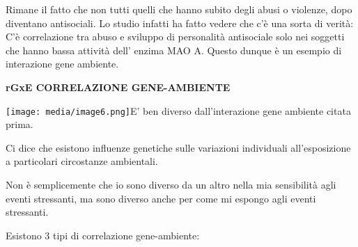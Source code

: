 \documentclass[]{article}
\begin{document}
Rimane il fatto che non tutti quelli che hanno subito degli abusi o
violenze, dopo diventano antisociali. Lo studio infatti ha fatto vedere
che c'è una sorta di verità: C'è correlazione tra abuso e sviluppo di
personalità antisociale solo nei soggetti che hanno bassa attività dell'
enzima MAO A. Questo dunque è un esempio di interazione gene ambiente.

\textbf{rGxE CORRELAZIONE GENE-AMBIENTE}

\texttt{[image: media/image6.png]}E'
ben diverso dall'interazione gene ambiente citata prima.

Ci dice che esistono influenze genetiche sulle variazioni individuali
all'esposizione a particolari circostanze ambientali.

Non è semplicemente che io sono diverso da un altro nella mia
sensibilità agli eventi stressanti, ma sono diverso anche per come mi
espongo agli eventi stressanti.

Esistono 3 tipi di correlazione gene-ambiente:
\end{document}
